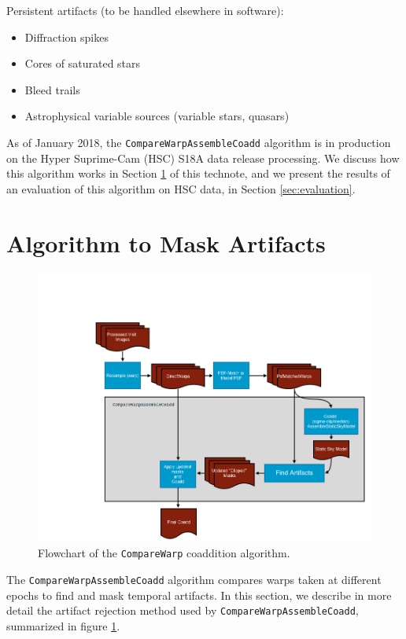 \documentclass[DM,authoryear,toc]{lsstdoc}
\begin{document}
Persistent artifacts (to be handled elsewhere in software):
\begin{itemize}
\item Diffraction spikes
\item Cores of saturated stars
\item Bleed trails
\item Astrophysical variable sources (variable stars, quasars)
\end{itemize}

As of January 2018, the \texttt{CompareWarpAssembleCoadd} algorithm is in production on the Hyper Suprime-Cam (HSC) S18A data release processing.
We discuss how this algorithm works in Section \ref{sec:method} of this technote, and we present the results of an evaluation of this algorithm on HSC data, in Section \ref{sec:evaluation}.

\section{Algorithm to Mask Artifacts}
\label{sec:method}

\begin{figure}
\includegraphics[width=1.0\textwidth]{figures/CompareWarpFlow.png}
\caption{Flowchart of the \texttt{CompareWarp} coaddition algorithm.\label{fig:flowchart}}
\end{figure}

The \texttt{CompareWarpAssembleCoadd} algorithm compares warps taken at different epochs to find and mask temporal artifacts.
In this section, we describe in more detail the artifact rejection method used by \texttt{CompareWarpAssembleCoadd}, summarized in figure \ref{fig:flowchart}.
\end{document}
